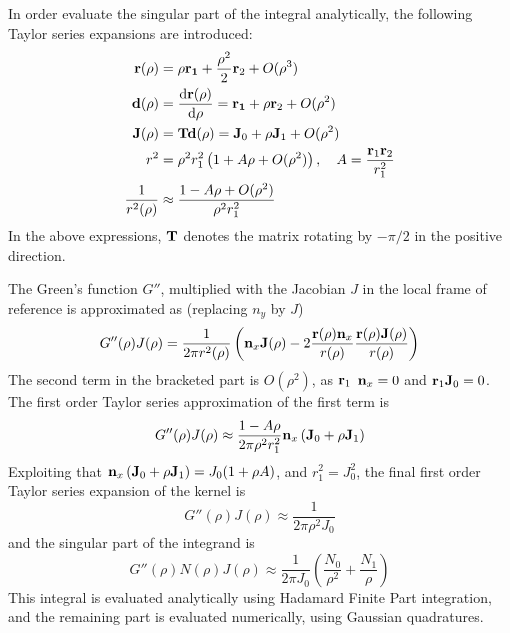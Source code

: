 In order evaluate the singular part of the integral analytically, the following Taylor series expansions are introduced:
\begin{align}
	{\bf r}(\rho) &= \rho {\bf r_1} + \frac{\rho^2}{2} {\bf r}_2 + O(\rho^3) \\
	{\bf d}(\rho) &= \frac{\mathrm{d} {\bf r}(\rho)}{\mathrm{d} \rho} = {\bf r_1} + \rho {\bf r}_2 + O(\rho^2)\\
	{\bf J}(\rho) &= {\bf T} {\bf d}(\rho) = {\bf J}_0 + \rho {\bf J}_1 + O(\rho^2) \\
	r^2 &= \rho^2 r_1^2 \left( 1 + A \rho + O(\rho^2) \right)
	,\quad A = \frac{{\bf r}_1 {\bf r}_2}{r_1^2} \\
	\frac{1}{r^2(\rho)} &\approx \frac{1 - A \rho + O(\rho^2)}{\rho^2 r_1^2}
\end{align}
%
In the above expressions, ${\bf T}$ denotes the matrix rotating by $-\pi/2$ in the positive direction.

The Green's function $G''$, multiplied with the Jacobian $J$ in the local frame of reference is approximated as (replacing $n_y$ by $J$)
%
\begin{equation}
	G''(\rho) J(\rho)
	= \frac{1}{2\pi r^2(\rho)} \left( {\bf n}_x {\bf J}(\rho) - 2 \frac{{\bf r}(\rho) {\bf n}_x}{r(\rho)} \frac{{\bf r}(\rho) {\bf J}(\rho)}{r(\rho)}\right)
\end{equation}
%
The second term in the bracketed part is $O(\rho^2)$, as ${\bf r}_1$ ${\bf n}_x = 0$ and ${\bf r}_1 {\bf J}_0 = 0$.
The first order Taylor series approximation of the first term is
%
\begin{equation}
	G''(\rho) J(\rho) \approx \frac{1 - A \rho}{2\pi \rho^2 r_1^2} {\bf n}_x \left({\bf J}_0 + \rho {\bf J}_1\right) 
\end{equation}
%
Exploiting that ${\bf n}_x \left({\bf J}_0 + \rho {\bf J}_1\right) = J_0 (1 + \rho A)$, and $r_1^2 = J_0^2$, the final first order Taylor series expansion of the kernel is
%
\begin{equation}
	G''(\rho) J(\rho) \approx \frac{1}{2\pi \rho^2 J_0}
\end{equation}
%
and the singular part of the integrand is
%
\begin{equation}
	G''(\rho) N(\rho) J(\rho) \approx \frac{1}{2\pi J_0} \left( \frac{N_0}{\rho^2} +  \frac{N_1}{\rho} \right)
\end{equation}
%
This integral is evaluated analytically using Hadamard Finite Part integration, and the remaining part is evaluated numerically, using Gaussian quadratures.